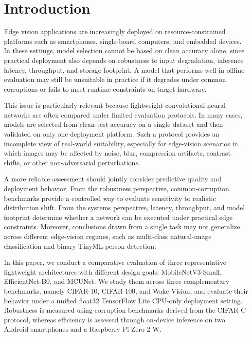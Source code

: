 \documentclass[runningheads]{llncs}
\begin{document}
\section{Introduction}

Edge vision applications are increasingly deployed on resource-constrained platforms such as smartphones, single-board computers, and embedded devices. In these settings, model selection cannot be based on clean accuracy alone, since practical deployment also depends on robustness to input degradation, inference latency, throughput, and storage footprint. A model that performs well in offline evaluation may still be unsuitable in practice if it degrades under common corruptions or fails to meet runtime constraints on target hardware.

This issue is particularly relevant because lightweight convolutional neural networks are often compared under limited evaluation protocols. In many cases, models are selected from clean-test accuracy on a single dataset and then validated on only one deployment platform. Such a protocol provides an incomplete view of real-world suitability, especially for edge-vision scenarios in which images may be affected by noise, blur, compression artifacts, contrast shifts, or other non-adversarial perturbations.

A more reliable assessment should jointly consider predictive quality and deployment behavior. From the robustness perspective, common-corruption benchmarks provide a controlled way to evaluate sensitivity to realistic distribution shift. From the systems perspective, latency, throughput, and model footprint determine whether a network can be executed under practical edge constraints. Moreover, conclusions drawn from a single task may not generalize across different edge-vision regimes, such as multi-class natural-image classification and binary TinyML person detection.

In this paper, we conduct a comparative evaluation of three representative lightweight architectures with different design goals: MobileNetV3-Small, EfficientNet-B0, and MCUNet. We study them across three complementary benchmarks, namely CIFAR-10, CIFAR-100, and Wake Vision, and evaluate their behavior under a unified float32 TensorFlow Lite CPU-only deployment setting. Robustness is measured using corruption benchmarks derived from the CIFAR-C protocol, whereas efficiency is assessed through on-device inference on two Android smartphones and a Raspberry Pi Zero 2 W.
\end{document}
